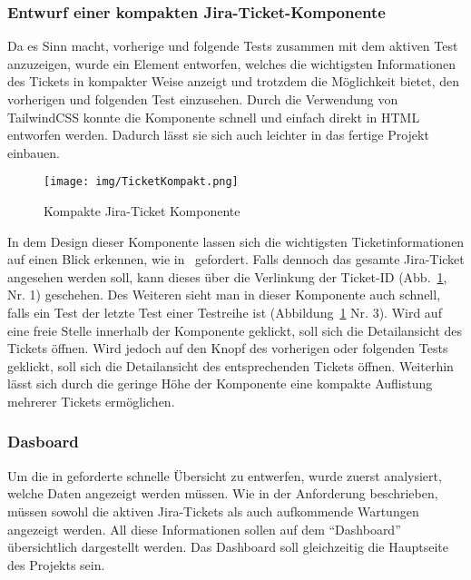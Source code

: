 \subsubsection{Entwurf einer kompakten Jira-Ticket-Komponente}\label{sec:jirakompakt}
Da es Sinn macht, vorherige und folgende Tests zusammen mit dem aktiven Test 
anzuzeigen, wurde ein Element entworfen, welches die wichtigsten Informationen 
des Tickets in kompakter Weise anzeigt und trotzdem die Möglichkeit bietet, den 
vorherigen und folgenden Test einzusehen.
Durch die Verwendung von TailwindCSS konnte die Komponente schnell und einfach 
direkt in \gls{HTML} entworfen werden. Dadurch lässt sie sich auch leichter in
das fertige Projekt einbauen.

\begin{figure}[H]
    \texttt{[image: img/TicketKompakt.png]}
    \caption{Kompakte Jira-Ticket Komponente}\label{fig:ticketcompact}
\end{figure}

In dem Design dieser Komponente lassen sich die wichtigsten Ticketinformationen
auf einen Blick erkennen, wie in~ gefordert. 
Falls dennoch das gesamte Jira-Ticket angesehen werden soll,
kann dieses über die Verlinkung der Ticket-ID (Abb.~\ref{fig:ticketcompact}, Nr. 1) 
geschehen. Des Weiteren sieht man in dieser Komponente auch schnell, falls ein 
Test der letzte Test einer Testreihe ist (Abbildung~\ref{fig:ticketcompact} Nr. 3).
Wird auf eine freie Stelle innerhalb der Komponente geklickt, soll sich die 
Detailansicht des Tickets öffnen. Wird jedoch auf 
den Knopf des vorherigen oder folgenden Tests geklickt, soll sich die Detailansicht des 
entsprechenden Tickets öffnen. Weiterhin lässt sich durch die geringe Höhe der 
Komponente eine kompakte Auflistung mehrerer Tickets ermöglichen.

\newpage 

\subsubsection{Dasboard}
Um die in  geforderte schnelle Übersicht zu entwerfen, 
wurde zuerst analysiert, welche Daten angezeigt werden müssen. Wie in der 
Anforderung  beschrieben, müssen sowohl die aktiven Jira-Tickets als auch 
aufkommende Wartungen angezeigt werden. All diese Informationen sollen auf dem 
``Dashboard'' übersichtlich dargestellt werden. Das Dashboard soll gleichzeitig
die Hauptseite des Projekts sein.

